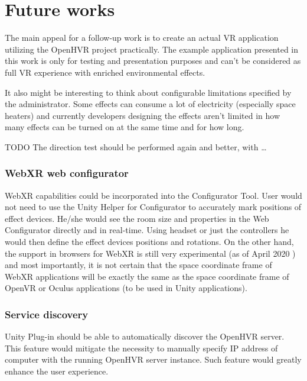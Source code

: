 \chapter{Future works}
The main appeal for a follow-up work is to create an actual VR application
utilizing the OpenHVR project practically. The example application presented in this
work is only for testing and presentation purposes and can’t be considered as
full VR experience with enriched environmental effects.


It also might be interesting to think about configurable limitations specified
by the administrator.
Some effects can consume a lot of electricity (especially space heaters)
and currently developers designing the effects aren’t limited in how many
effects can be turned on at the same time and for how long.


{TODO} The direction test should be performed again and better, with …​


\hypertarget{x-webxr-web-configurator}{\subsection*{WebXR web configurator}}
WebXR capabilities could be incorporated into the Configurator Tool.
User would not need to use the Unity Helper for Configurator to accurately
mark positions of effect devices. He/she would see the room
size and properties in the Web Configurator directly and
in real-time. Using headset or just the controllers he would then define
the effect devices positions and rotations. On the other hand, the support in
browsers for WebXR is still very experimental (as of April 2020 \hyperlink{webxr}{}) and
most importantly, it is not certain that the space coordinate frame of
WebXR applications will be exactly the same as the space coordinate frame
of OpenVR or Oculus applications (to be used in Unity applications).


\hypertarget{x-service-discovery}{\subsection*{Service discovery}}
Unity Plug-in should be able to automatically discover the OpenHVR server.
This feature would mitigate the necessity to manually specify IP address
of computer with the running OpenHVR server instance. Such feature would
greatly enhance the user experience.